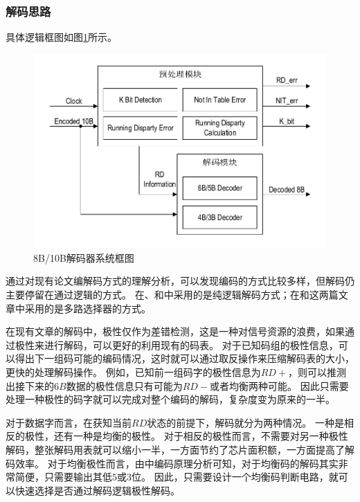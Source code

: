 \documentclass[UTF8]{ctexart}
\begin{document}
\subsubsection{解码思路}

具体逻辑框图如图\ref{fig:8b10b_decoder_diagram}所示。

\begin{figure}[H]
\centering
\includegraphics[width=14cm]{./img/8b10b_decoder_diagram.pdf}
\caption{8B/10B解码器系统框图}
\label{fig:8b10b_decoder_diagram}
\end{figure}

通过对现有论文编解码方式的理解分析，可以发现编码的方式比较多样，但解码仍主要停留在通过逻辑的方式。
在\cite{zhaoyh2003}、\cite{hecf2005}和\cite{Widmer1983}中采用的是纯逻辑解码方式；在\cite{wenl2007}和\cite{Actel1998}这两篇文章中采用的是多路选择器的方式。

在现有文章的解码中，极性仅作为差错检测，这是一种对信号资源的浪费，如果通过极性来进行解码，可以更好的利用现有的码表。
对于已知码组的极性信息，可以得出下一组码可能的编码情况，这时就可以通过取反操作来压缩解码表的大小，更快的处理解码操作。
例如，已知前一组码字的极性信息为$RD+$，则可以推测出接下来的$6B$数据的极性信息只有可能为$RD-$或者均衡两种可能。
因此只需要处理一种极性的码字就可以完成对整个编码的解码，复杂度变为原来的一半。

对于数据字而言，在获知当前$RD$状态的前提下，解码就分为两种情况。
一种是相反的极性，还有一种是均衡的极性。
对于相反的极性而言，不需要对另一种极性解码，整张解码用表就可以缩小一半，一方面节约了芯片面积额，一方面提高了解码效率。
对于均衡极性而言，由\cite{Widmer1983}中编码原理分析可知，对于均衡码的解码其实非常简便，只需要输出其低$5$或$3$位。
因此，只需要设计一个均衡码判断电路，就可以快速选择是否通过解码逻辑极性解码。
\end{document}

